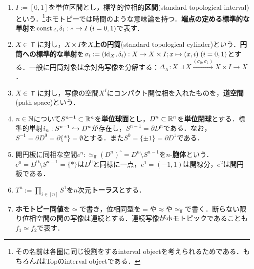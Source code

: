 \documentclass[uplatex,dvipdfmx]{jsreport}
\begin{document}
\begin{notation}[基本的空間]\mbox{}
    \begin{enumerate}
        \item $I:=[0,1]$を単位区間とし，標準的位相的\textbf{区間}(standard topological interval)という．\footnote{その名前は各圏に同じ役割をするinterval objectを考えられるためである．もちろん$I$はTopのinterval objectである．}ホモトピーでは時間のような意味論を持つ．\textbf{端点の定める標準的な単射}を$\mathrm{const.}_i,\delta_i:*\to I\;(i=0,1)$で表す．
        \item $X\in\Top$に対し，$X\times I$を\textbf{$X$上の円筒}(standard topological cylinder)という．\textbf{円筒への標準的な単射}を$\sigma_i:=(\mathrm{id}_X,\delta_i):X\to X\times I;x\mapsto (x,i)\;(i=0,1)$とする．一般に円筒対象は余対角写像を分解する：$\Delta_X:X\sqcup X\xrightarrow{(\sigma_0,\sigma_1)}X\times I\to X$．
        \item $X\in\Top$に対し，写像の空間$X^I$にコンパクト開位相を入れたものを，\textbf{道空間}(path space)という．
        \item $n\in\mathbb{N}$について$S^{n-1}\subset\mathbb{R}^n$を\textbf{単位球面}とし，$D^n\subset\mathbb{R}^n$を\textbf{単位閉球}とする．標準的単射$i_n:S^{n-1}\hookrightarrow D^n$が存在し，$S^{n-1}=\partial D^n$である．なお，$S^{-1}=\partial D^0=\partial\{*\}=\emptyset$とする．また$S^0=\{\pm 1\}=\partial D^1$である．
        \item 開円板に同相な空間$e^n:\simeq_{\Top}(D^n)^\circ=D^n\setminus S^{n-1}$を$n$-\textbf{胞体}という．$e^0=D^0\setminus S^{n-1}=\{*\}$は$D^0$と同様に一点，$e^1=(-1,1)$は開線分，$e^2$は開円板である．
        \item $T^n:=\prod_{i\in[n]}S^1$を$n$次元\textbf{トーラス}とする．
        \item \textbf{ホモトピー同値}を$\simeq$で書き，位相同型を$=$や$\approx$や$\simeq_\Top$で書く．断らない限り位相空間の間の写像は連続とする．連続写像がホモトピックであることも$f_1\simeq f_2$で表す．
    \end{enumerate}
\end{notation}
\end{document}
